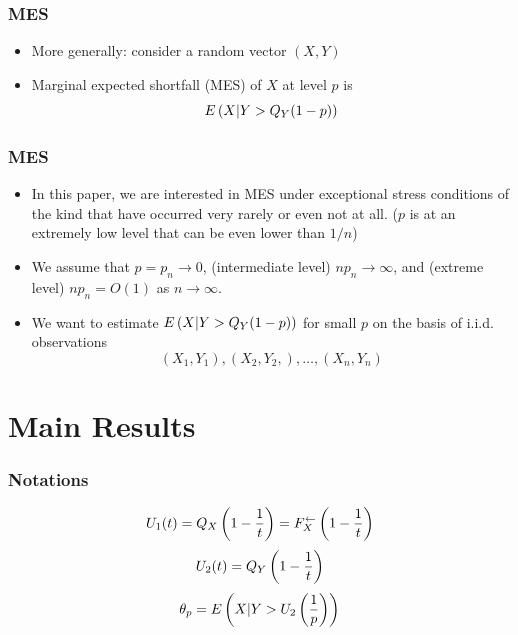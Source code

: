 \documentclass{beamer}
\begin{document}
\begin{frame}
    \frametitle{MES}

\begin{itemize}
    \item More generally: consider a random vector $(X,Y)$
    \vspace{5ex}
    \item Marginal expected shortfall (MES) of $X$ at level $p$ is 
    $$
    E\left(X|Y>Q_Y(1-p)\right)
    $$
\end{itemize}

\end{frame}


\begin{frame}
    \frametitle{MES}
\begin{itemize}
    \item In this paper, we are interested in MES under exceptional stress
    conditions of the kind that have occurred very
    rarely or even not at all.  ($p$ is at an
    extremely low level that can be even lower than $1/n$)

    \vspace{5ex}
    \item We assume that $p=p_n\to 0$, (intermediate level) $np_n \to\infty$,  and (extreme level) $np_n = O(1)$ as $n\to \infty$.   
    \vspace{5ex}
   \item We want to estimate $E\left(X|Y>Q_Y(1-p)\right)$
   for small $p$ on the basis of i.i.d. observations
   $$
        (X_1,Y_1),(X_2,Y_2,),\dots,(X_n,Y_n)
   $$
\end{itemize}
    

\end{frame}



\section{Main Results}
\begin{frame}
    \frametitle{Notations}
$$
U_1(t) =Q_X\left(1-\frac{1}{t}\right) =F_X^{\leftarrow}\left(1-\frac{1}{t}\right)
$$
$$
U_2(t) =Q_Y\left(1-\frac{1}{t}\right)
$$
$$
\theta_p = E\left(X|Y>U_2\left(\frac{1}{p}\right)\right)
$$
    

\end{frame}
\end{document}
